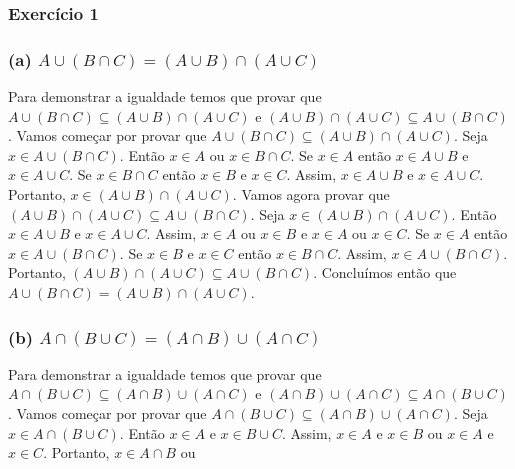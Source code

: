 \subsubsection{Exercício 1}

\subsubsection*{(a) $A \cup (B \cap C) = (A \cup B)  \cap (A \cup C)$}

\begin{spacing}{1.5}

Para demonstrar a igualdade temos que provar que $A \cup (B \cap C) \subseteq (A \cup B)  \cap (A \cup C)$ e $(A \cup B)  \cap (A \cup C) \subseteq A \cup (B \cap C)$. Vamos começar por provar que $A \cup (B \cap C) \subseteq (A \cup B)  \cap (A \cup C)$. Seja $x \in A \cup (B \cap C)$. Então $x \in A$ ou $x \in B \cap C$. Se $x \in A$ então $x \in A \cup B$ e $x \in A \cup C$. Se $x \in B \cap C$ então $x \in B$ e $x \in C$. Assim, $x \in A \cup B$ e $x \in A \cup C$. Portanto, $x \in (A \cup B)  \cap (A \cup C)$. Vamos agora provar que $(A \cup B)  \cap (A \cup C) \subseteq A \cup (B \cap C)$. Seja $x \in (A \cup B)  \cap (A \cup C)$. Então $x \in A \cup B$ e $x \in A \cup C$. Assim, $x \in A$ ou $x \in B$ e $x \in A$ ou $x \in C$. Se $x \in A$ então $x \in A \cup (B \cap C)$. Se $x \in B$ e $x \in C$ então $x \in B \cap C$. Assim, $x \in A \cup (B \cap C)$. Portanto, $(A \cup B)  \cap (A \cup C) \subseteq A \cup (B \cap C)$. Concluímos então que $A \cup (B \cap C) = (A \cup B)  \cap (A \cup C)$.
\end{spacing}

\subsubsection*{(b) $A \cap (B \cup C) = (A \cap B) \cup (A \cap C)$}

Para demonstrar a igualdade temos que provar que $A \cap (B \cup C) \subseteq (A \cap B) \cup (A \cap C)$ e $(A \cap B) \cup (A \cap C) \subseteq A \cap (B \cup C)$ . Vamos começar por provar que $A \cap (B \cup C) \subseteq (A \cap B) \cup (A \cap C)$. Seja $x \in A \cap (B \cup C)$. Então $x \in A$ e $x \in B \cup C$. Assim, $x \in A$ e $x \in B$ ou $x \in A$ e $x \in C$. Portanto, $x \in A \cap B$ ou
